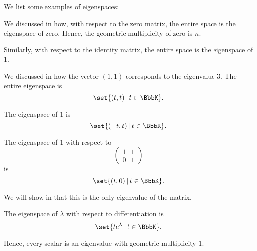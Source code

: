 \begin{example}\label{ex:def:eigenspace}
  We list some examples of \hyperref[def:eigenspace]{eigenspaces}:
  \begin{thmenum}
     We discussed in  how, with respect to the zero matrix, the entire space is the eigenspace of zero. Hence, the geometric multiplicity of zero is \( n \).

     Similarly, with respect to the identity matrix, the entire space is the eigenspace of \( 1 \).

     We discussed in  how the vector \( (1, 1) \) corresponds to the eigenvalue \( 3 \). The entire eigenspace is
    \begin{equation*}
      \set{ (t, t) \given t \in \BbbK }.
    \end{equation*}

    The eigenspace of \( 1 \) is
    \begin{equation*}
      \set{ (-t, t) \given t \in \BbbK }.
    \end{equation*}

     The eigenspace of \( 1 \) with respect to
    \begin{equation*}
      \begin{pmatrix}
        1 & 1 \\
        0 & 1
      \end{pmatrix}
    \end{equation*}
    is
    \begin{equation*}
      \set{ (t, 0) \given t \in \BbbK }.
    \end{equation*}

    We will show in  that this is the only eigenvalue of the matrix.

     The eigenspace of \( \lambda \) with respect to differentiation is
    \begin{equation*}
      \set{ t e^\lambda \given t \in \BbbK }.
    \end{equation*}

    Hence, every scalar is an eigenvalue with geometric multiplicity \( 1 \).
  \end{thmenum}
\end{example}

\begin{proposition}\label{thm:eigenspace_direct_sum}

\end{proposition}

